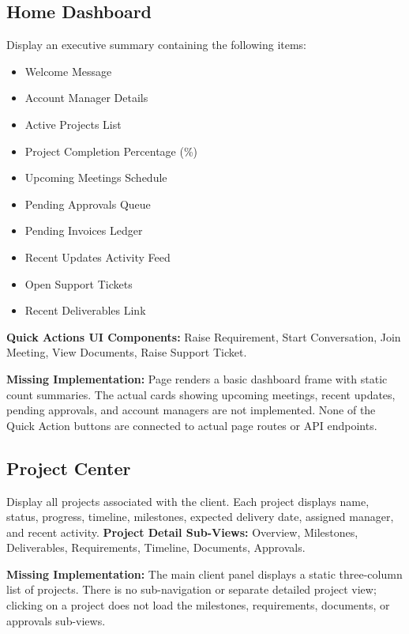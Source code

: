 \documentclass[11pt,a4paper]{article}
\begin{document}
\subsection{Home Dashboard}
Display an executive summary containing the following items:
\begin{itemize}
    \item Welcome Message
    \item Account Manager Details
    \item Active Projects List
    \item Project Completion Percentage (\%)
    \item Upcoming Meetings Schedule
    \item Pending Approvals Queue
    \item Pending Invoices Ledger
    \item Recent Updates Activity Feed
    \item Open Support Tickets
    \item Recent Deliverables Link
\end{itemize}
\textbf{Quick Actions UI Components:} Raise Requirement, Start Conversation, Join Meeting, View Documents, Raise Support Ticket.
\begin{partialstatus}
  \textbf{Missing Implementation:} Page renders a basic dashboard frame with static count summaries. The actual cards showing upcoming meetings, recent updates, pending approvals, and account managers are not implemented. None of the Quick Action buttons are connected to actual page routes or API endpoints.
\end{partialstatus}

\subsection{Project Center}
Display all projects associated with the client. Each project displays name, status, progress, timeline, milestones, expected delivery date, assigned manager, and recent activity.
\newline
\textbf{Project Detail Sub-Views:} Overview, Milestones, Deliverables, Requirements, Timeline, Documents, Approvals.
\begin{partialstatus}
  \textbf{Missing Implementation:} The main client panel displays a static three-column list of projects. There is no sub-navigation or separate detailed project view; clicking on a project does not load the milestones, requirements, documents, or approvals sub-views.
\end{partialstatus}
\end{document}
